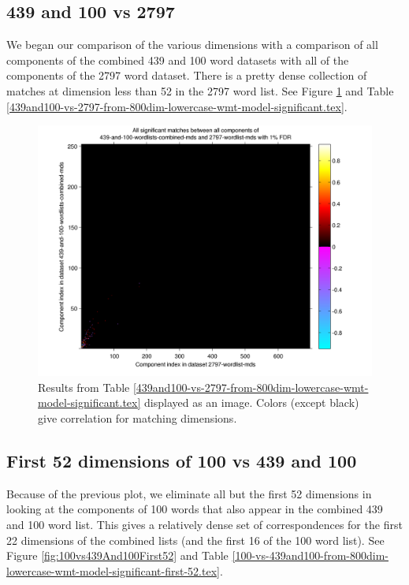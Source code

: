 \documentclass[10pt,letterpaper]{book}
\begin{document}
\subsection{439 and 100 vs 2797}

We began our comparison of the various dimensions with a comparison of all 
components of the combined 439 and 100 word datasets with all of the components
of the 2797 word dataset. There is a pretty dense collection of matches at
dimension less than 52 in the 2797 word list. See Figure 
\ref{fig:439and100vs2797} and Table
\ref{439and100-vs-2797-from-800dim-lowercase-wmt-model-significant.tex}. 



\begin{figure}[!tbp]
    \includegraphics[width=0.9\linewidth]{439and100-vs-2797-from-800dim-lowercase-wmt-model-significant}
    \caption{Results from Table 
    \ref{439and100-vs-2797-from-800dim-lowercase-wmt-model-significant.tex} 
    displayed as an image. Colors (except black) give correlation for matching 
    dimensions.}
    \label{fig:439and100vs2797}
\end{figure}

\subsection{First 52 dimensions of 100 vs 439 and 100}

Because of the previous plot, we eliminate all but the first 52 dimensions in
looking at the components of 100 words that also appear in the combined 439
and 100 word list. This gives a relatively dense set of correspondences for the
first 22 dimensions of the combined lists (and the first 16 of the 100 word
list). See Figure \ref{fig:100vs439And100First52} and Table 
\ref{100-vs-439and100-from-800dim-lowercase-wmt-model-significant-first-52.tex}.
\end{document}
